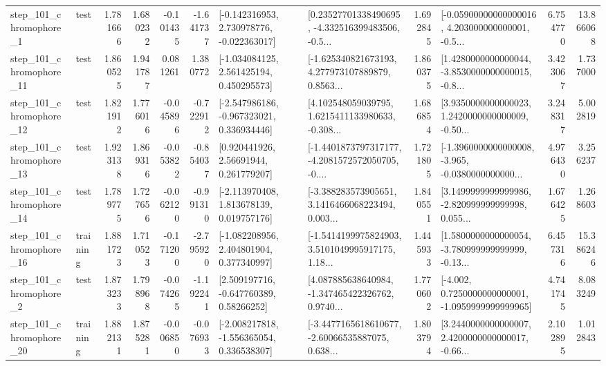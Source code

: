 \begin{tabular}{llrrrrllrlrr}
   step\_101\_chromophore\_1 &      test &      1.781666 &    1.680232 &     -0.101435 & -1.641737 &   [-0.142316953, 2.730978776, -0.022363017] &  [0.23527701338490695, -4.332516399483506, -0.5... &       1.692845 &  [-0.05900000000000016, 4.203000000000001, -0.5... &            6.754770 &         13.866068 \\
  step\_101\_chromophore\_11 &      test &      1.860525 &    1.941787 &      0.081261 &  1.380772 &    [-1.034084125, 2.561425194, 0.450295573] &  [-1.625340821673193, 4.277973107889879, 0.8563... &       1.860375 &  [1.4280000000000044, -3.8530000000000015, -0.8... &            3.423067 &          1.737000 \\
  step\_101\_chromophore\_12 &      test &      1.821912 &    1.776016 &     -0.045896 & -0.722912 &   [-2.547986186, -0.967323021, 0.336934446] &  [4.102548059039795, 1.6215411133980633, -0.308... &       1.686854 &  [3.9350000000000023, 1.2420000000000009, -0.50... &            3.248317 &          5.002819 \\
  step\_101\_chromophore\_13 &      test &      1.923138 &    1.869316 &     -0.053822 & -0.854037 &      [0.920441926, 2.56691944, 0.261779207] &  [-1.4401873797317177, -4.2081572572050705, -0.... &       1.721805 &  [-1.3960000000000008, -3.965, -0.0380000000000... &            4.976430 &          3.256237 \\
  step\_101\_chromophore\_14 &      test &      1.789775 &    1.727656 &     -0.062120 & -0.991310 &    [-2.113970408, 1.813678139, 0.019757176] &  [-3.388283573905651, 3.1416466068223494, 0.003... &       1.840551 &  [3.1499999999999986, -2.820999999999998, 0.055... &            1.676425 &          1.268603 \\
  step\_101\_chromophore\_16 &  training &      1.881723 &    1.710523 &     -0.171200 & -2.795920 &    [-1.082208956, 2.404801904, 0.377340997] &  [-1.5414199975824903, 3.5101049995917175, 1.18... &       1.445933 &  [1.5800000000000054, -3.780999999999999, -0.13... &            6.457316 &         15.386246 \\
   step\_101\_chromophore\_2 &      test &      1.873233 &    1.798968 &     -0.074265 & -1.192241 &     [2.509197716, -0.647760389, 0.58266252] &  [4.087885638640984, -1.347465422326762, 0.9740... &       1.770602 &  [-4.002, 0.7250000000000001, -1.0959999999999965] &            4.741745 &          8.083249 \\
  step\_101\_chromophore\_20 &  training &      1.882131 &    1.875281 &     -0.006850 & -0.076933 &   [-2.008217818, -1.556365054, 0.336538307] &  [-3.4477165618610677, -2.60066535887075, 0.638... &       1.803794 &  [3.2440000000000007, 2.4200000000000017, -0.66... &            2.102895 &          1.012843 \\

\end{tabular}
